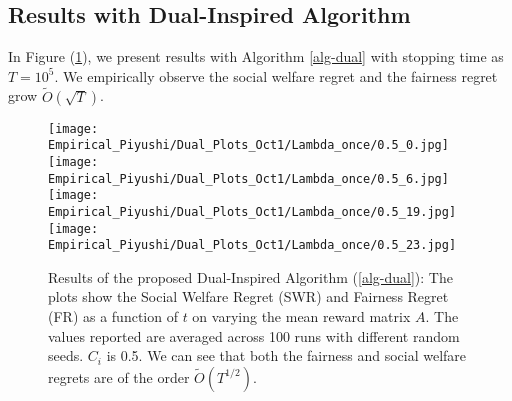 \subsection{Results with Dual-Inspired Algorithm}
In Figure (\ref{fig:dual}), we present results with Algorithm \ref{alg-dual} with stopping time as $T=10^5$. We empirically observe the social welfare regret and the fairness regret grow $\tilde{O}(\sqrt{T})$.

\begin{figure}[h!]
\texttt{[image: Empirical\_Piyushi/Dual\_Plots\_Oct1/Lambda\_once/0.5\_0.jpg]}
\texttt{[image: Empirical\_Piyushi/Dual\_Plots\_Oct1/Lambda\_once/0.5\_6.jpg]}\\
\texttt{[image: Empirical\_Piyushi/Dual\_Plots\_Oct1/Lambda\_once/0.5\_19.jpg]}
\texttt{[image: Empirical\_Piyushi/Dual\_Plots\_Oct1/Lambda\_once/0.5\_23.jpg]}
\vspace{-0.1in}
\caption[short]{Results of the proposed Dual-Inspired Algorithm (\ref{alg-dual}): The plots show the Social Welfare Regret (SWR) and Fairness Regret (FR) as a function of $t$ on varying the mean reward matrix $A$. The values reported are averaged across 100 runs with different random seeds. $C_i$ is 0.5. We can see that both the fairness and social welfare regrets are of the order $\tilde{O}(T^{1/2})$.}\label{fig:dual}
\end{figure}
\fi 